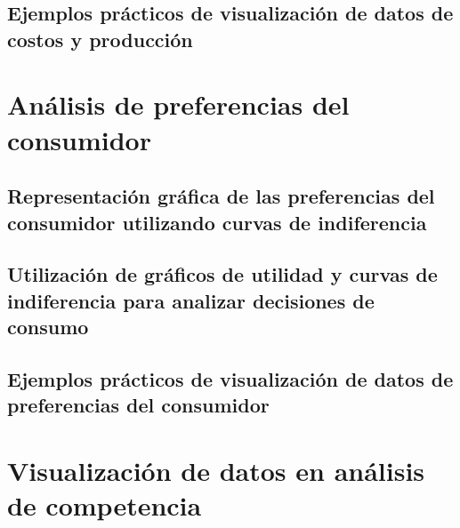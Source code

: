 \documentclass[
  a4paper,
]{article}
\begin{document}
\hypertarget{ejemplos-pruxe1cticos-de-visualizaciuxf3n-de-datos-de-costos-y-producciuxf3n}{%
\subsection{Ejemplos prácticos de visualización de datos de costos y
producción}\label{ejemplos-pruxe1cticos-de-visualizaciuxf3n-de-datos-de-costos-y-producciuxf3n}}

\hypertarget{anuxe1lisis-de-preferencias-del-consumidor}{%
\section{Análisis de preferencias del
consumidor}\label{anuxe1lisis-de-preferencias-del-consumidor}}

\hypertarget{representaciuxf3n-gruxe1fica-de-las-preferencias-del-consumidor-utilizando-curvas-de-indiferencia}{%
\subsection{Representación gráfica de las preferencias del consumidor
utilizando curvas de
indiferencia}\label{representaciuxf3n-gruxe1fica-de-las-preferencias-del-consumidor-utilizando-curvas-de-indiferencia}}

\hypertarget{utilizaciuxf3n-de-gruxe1ficos-de-utilidad-y-curvas-de-indiferencia-para-analizar-decisiones-de-consumo}{%
\subsection{Utilización de gráficos de utilidad y curvas de indiferencia
para analizar decisiones de
consumo}\label{utilizaciuxf3n-de-gruxe1ficos-de-utilidad-y-curvas-de-indiferencia-para-analizar-decisiones-de-consumo}}

\hypertarget{ejemplos-pruxe1cticos-de-visualizaciuxf3n-de-datos-de-preferencias-del-consumidor}{%
\subsection{Ejemplos prácticos de visualización de datos de preferencias
del
consumidor}\label{ejemplos-pruxe1cticos-de-visualizaciuxf3n-de-datos-de-preferencias-del-consumidor}}

\hypertarget{visualizaciuxf3n-de-datos-en-anuxe1lisis-de-competencia}{%
\section{Visualización de datos en análisis de
competencia}\label{visualizaciuxf3n-de-datos-en-anuxe1lisis-de-competencia}}
\end{document}
